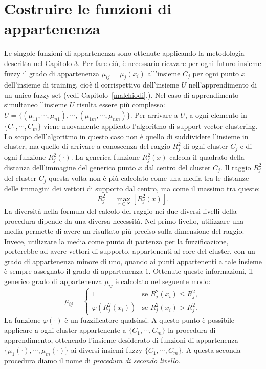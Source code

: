 \documentclass [11pt,a4paper,twoside,openright] {book}
\begin{document}
\section{Costruire le funzioni di appartenenza}
Le singole funzioni di appartenenza sono ottenute applicando la metodologia descritta nel Capitolo 3. Per fare ciò, è necessario ricavare per ogni futuro insieme fuzzy il grado di appartenenza $\mu_{ij}=\mu_j(x_i)$ all'insieme $C_j$ per ogni punto $x$ dell'insieme di training, cioè il corrispettivo dell'insieme $U$ nell'apprendimento di un unico fuzzy set (vedi Capitolo~\ref{malchiodi}.). Nel caso di apprendimento simultaneo l'insieme $U$ risulta essere più complesso: $U = \lbrace ( \mu_{11}, \cdots, \mu_{n1} ), \cdots, (\mu_{1m}, \cdots,  \mu_{nm}) \rbrace$. Per arrivare a $U$, a ogni elemento in $\lbrace C_1, \cdots, C_m \rbrace$ viene nuovamente applicato l'algoritmo di support vector clustering. Lo scopo dell'algoritmo in questo caso non è quello di suddividere l'insieme in cluster, ma quello di arrivare a conoscenza del raggio $R^2_j$ di ogni cluster $C_j$ e di ogni funzione $R_{j}^2(\cdot)$. La generica funzione $R_{j}^2(x)$ calcola il quadrato della distanza dell'immagine del generico punto $x$ dal centro del cluster $C_j$. Il raggio $R^2_j$ del cluster $C_j$ questa volta non è più calcolato come una media tra le distanze delle immagini dei vettori di supporto dal centro, ma come il massimo tra queste:
\begin{equation}
R^2_j = \max_{x \in S} [ R^2_j(x) ].
\end{equation}
La diversità nella formula del calcolo del raggio nei due diversi livelli della procedura dipende da una diversa necessità. Nel primo livello, utilizzare una media permette di avere un risultato più preciso sulla dimensione del raggio. Invece, utilizzare la media come punto di partenza per la fuzzificazione, porterebbe ad avere vettori di supporto, appartenenti al core del cluster, con un grado di appartenenza minore di uno, quando ai punti appartenenti a tale insieme è sempre assegnato il grado di appartenenza $1$.
Ottenute queste informazioni, il generico grado di appartenenza $\mu_{ij}$ è calcolato nel seguente modo:
\begin{equation}
\mu_{ij} =
\begin{cases}
1 & \text{se } R_{j}^2(x_i) \leq R^2_j, \\
\varphi(R_{j}^2(x_i)) & \text{se } R_{j}^2(x_i) > R^2_j.
\end{cases}
\end{equation}
La funzione $\varphi(\cdot)$ è un fuzzificatore qualsiasi. A questo punto è possibile applicare a ogni cluster appartenente a $\lbrace C_1, \cdots, C_m \rbrace$ la procedura di apprendimento, ottenendo l'insieme desiderato di funzioni di appartenenza $\lbrace \mu_1(\cdot), \cdots, \mu_m(\cdot) \rbrace$ ai diversi insiemi fuzzy $\lbrace C_1, \cdots, C_m \rbrace$. A questa seconda procedura diamo il nome di \textit{procedura di secondo livello}.
\end{document}
